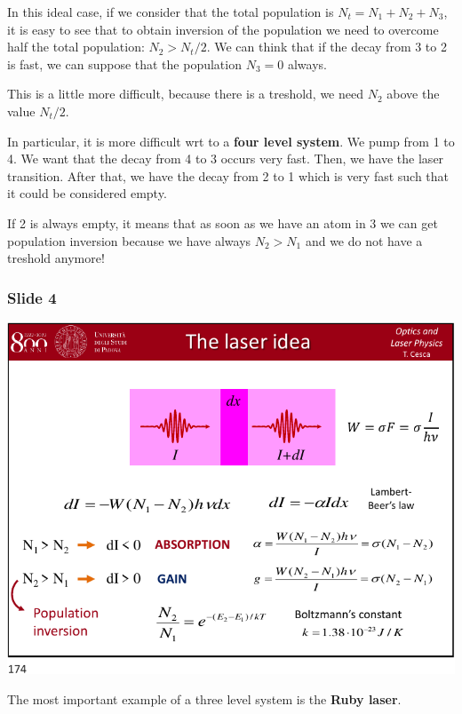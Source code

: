 \documentclass[../main/main.tex]{subfiles}
\begin{document}
In this ideal case, if we consider that the total population is \( N_t = N_1 + N_2 + N_3 \), it is easy to see that to obtain inversion of the population we need to overcome half the total population: \( N_2 > N_t /2 \). We can think that if the decay from 3 to 2 is fast, we can suppose that the population \( N_3 = 0 \) always.

This is a little more difficult, because there is a treshold, we need \( N_2 \) above the value \( N_t/2 \).

In particular, it is more difficult wrt to a \textbf{four level system}.
We pump from 1 to 4. We want that the decay from 4 to 3 occurs very fast. Then, we have the laser transition. After that, we have the decay from 2 to 1 which is very fast such that it could be considered empty.

If 2 is always empty, it means that as soon as we have an atom in 3 we can get population inversion because we have always \( N_2>N_1 \) and we do not have a treshold anymore!

\subsubsection*{Slide 4}

\begin{minipage}[]{0.5\linewidth}
\centering
\includegraphics[page=4,width=1\textwidth]{../lessons/pdf_file/09_lecture.pdf}
\end{minipage}
\hspace{0.3cm}\vspace{0.3cm}
\begin{minipage}[c]{0.47\linewidth}

The most important example of a three level system is the \textbf{Ruby laser}.

\end{minipage}
\end{document}
